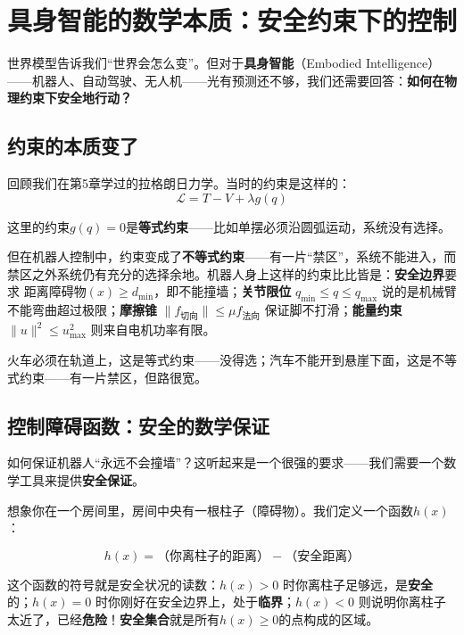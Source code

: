 \section{具身智能的数学本质：安全约束下的控制}

世界模型告诉我们“世界会怎么变”。但对于\textbf{具身智能}（Embodied Intelligence）——机器人、自动驾驶、无人机——光有预测还不够，我们还需要回答：\textbf{如何在物理约束下安全地行动？}

\subsection{约束的本质变了}

回顾我们在第5章学过的拉格朗日力学。当时的约束是这样的：
\begin{equation}
    \mathcal{L} = T - V + \lambda g(q)
\end{equation}

这里的约束$g(q) = 0$是\textbf{等式约束}——比如单摆必须沿圆弧运动，系统没有选择。

但在机器人控制中，约束变成了\textbf{不等式约束}——有一片“禁区”，系统不能进入，而禁区之外系统仍有充分的选择余地。机器人身上这样的约束比比皆是：\textbf{安全边界}要求 $\text{距离障碍物}(x) \geq d_{\min}$，即不能撞墙；\textbf{关节限位} $q_{\min} \leq q \leq q_{\max}$ 说的是机械臂不能弯曲超过极限；\textbf{摩擦锥} $\|f_{\text{切向}}\| \leq \mu f_{\text{法向}}$ 保证脚不打滑；\textbf{能量约束} $\|u\|^2 \leq u_{\max}^2$ 则来自电机功率有限。

\begin{example}
火车必须在轨道上，这是等式约束——没得选；汽车不能开到悬崖下面，这是不等式约束——有一片禁区，但路很宽。
\end{example}

\subsection{控制障碍函数：安全的数学保证}
\label{sec:cbf}

如何保证机器人“永远不会撞墙”？这听起来是一个很强的要求——我们需要一个数学工具来提供\textbf{安全保证}。

\begin{definition}
想象你在一个房间里，房间中央有一根柱子（障碍物）。我们定义一个函数$h(x)$：

\begin{equation}
    h(x) = \text{（你离柱子的距离）} - \text{（安全距离）}
\end{equation}

这个函数的符号就是安全状况的读数：$h(x) > 0$ 时你离柱子足够远，是\textbf{安全}的；$h(x) = 0$ 时你刚好在安全边界上，处于\textbf{临界}；$h(x) < 0$ 则说明你离柱子太近了，已经\textbf{危险}！\textbf{安全集合}就是所有$h(x) \geq 0$的点构成的区域。
\end{definition}

